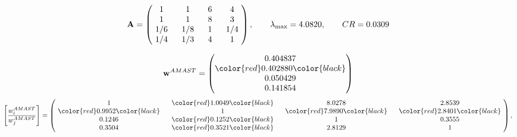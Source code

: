 \begin{example}
\begin{equation*}
\mathbf{A} =
\begin{pmatrix}
$\,\,$ 1 $\,\,$ & $\,\,$1$\,\,$ & $\,\,$6$\,\,$ & $\,\,$4 $\,\,$ \\
$\,\,$ 1 $\,\,$ & $\,\,$ 1 $\,\,$ & $\,\,$8$\,\,$ & $\,\,$3 $\,\,$ \\
$\,\,$ 1/6$\,\,$ & $\,\,$ 1/8$\,\,$ & $\,\,$ 1 $\,\,$ & $\,\,$ 1/4 $\,\,$ \\
$\,\,$ 1/4$\,\,$ & $\,\,$ 1/3$\,\,$ & $\,\,$4$\,\,$ & $\,\,$ 1  $\,\,$ \\
\end{pmatrix},
\qquad
\lambda_{\max} =
4.0820,
\qquad
CR = 0.0309
\end{equation*}

\begin{equation*}
\mathbf{w}^{AMAST} =
\begin{pmatrix}
0.404837\\
\color{red} 0.402880\color{black} \\
0.050429\\
0.141854
\end{pmatrix}\end{equation*}
\begin{equation*}
\left[ \frac{{w}^{AMAST}_i}{{w}^{AMAST}_j} \right] =
\begin{pmatrix}
$\,\,$ 1 $\,\,$ & $\,\,$\color{red} 1.0049\color{black} $\,\,$ & $\,\,$8.0278$\,\,$ & $\,\,$2.8539$\,\,$ \\
$\,\,$\color{red} 0.9952\color{black} $\,\,$ & $\,\,$ 1 $\,\,$ & $\,\,$\color{red} 7.9890\color{black} $\,\,$ & $\,\,$\color{red} 2.8401\color{black}   $\,\,$ \\
$\,\,$0.1246$\,\,$ & $\,\,$\color{red} 0.1252\color{black} $\,\,$ & $\,\,$ 1 $\,\,$ & $\,\,$0.3555 $\,\,$ \\
$\,\,$0.3504$\,\,$ & $\,\,$\color{red} 0.3521\color{black} $\,\,$ & $\,\,$2.8129$\,\,$ & $\,\,$ 1  $\,\,$ \\
\end{pmatrix},
\end{equation*}


\end{example}
